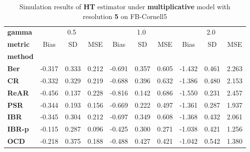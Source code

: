 \begin{table}
\centering
\caption{Simulation results of \textbf{HT} estimator under \textbf{multiplicative} model with resolution \textbf{5} on FB-Cornell5}
\begin{tabular}{lccccccccc}
\toprule
\textbf{gamma} & \multicolumn{3}{c}{0.5} & \multicolumn{3}{c}{1.0} & \multicolumn{3}{c}{2.0} \\
\textbf{metric} &   Bias &     SD &    MSE &   Bias &     SD &    MSE &   Bias &     SD &    MSE \\
\textbf{method} &        &        &        &        &        &        &        &        &        \\
\midrule
\textbf{Ber} & -0.317 &  0.333 &  0.212 & -0.691 &  0.357 &  0.605 & -1.432 &  0.461 &  2.263 \\
\textbf{CR} & -0.332 &  0.329 &  0.219 & -0.688 &  0.396 &  0.632 & -1.386 &  0.480 &  2.153 \\
\textbf{ReAR} & -0.456 &  0.137 &  0.228 & -0.816 &  0.142 &  0.686 & -1.550 &  0.231 &  2.457 \\
\textbf{PSR} & -0.344 &  0.193 &  0.156 & -0.669 &  0.222 &  0.497 & -1.361 &  0.287 &  1.937 \\
\textbf{IBR} & -0.345 &  0.304 &  0.212 & -0.697 &  0.349 &  0.608 & -1.368 &  0.432 &  2.061 \\
\textbf{IBR-p} & -0.115 &  0.287 &  0.096 & -0.425 &  0.300 &  0.271 & -1.038 &  0.421 &  1.256 \\
\textbf{OCD} & -0.218 &  0.375 &  0.188 & -0.488 &  0.427 &  0.421 & -1.042 &  0.542 &  1.380 \\
\bottomrule
\end{tabular}
\end{table}
